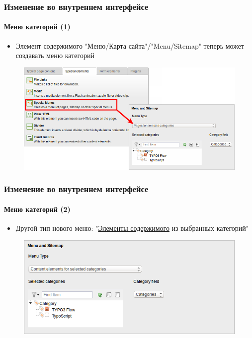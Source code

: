 
\begin{frame}[fragile]
	\frametitle{Изменение во внутреннем интерфейсе}
	\framesubtitle{Меню категорий (1)}

	\begin{itemize}
		\item Элемент содержимого "Меню/Карта сайта"/"Menu/Sitemap" теперь может создавать меню категорий
	\end{itemize}

	\begin{figure}
		\includegraphics[width=0.8\linewidth]{Images/BackendChanges/CategoryBasedMenus.png}
	\end{figure}

\end{frame}



\begin{frame}[fragile]
	\frametitle{Изменение во внутреннем интерфейсе}
	\framesubtitle{Меню категорий (2)}

	\begin{itemize}
		\item Другой тип нового меню: "\underline{Элементы содержимого} из выбранных категорий"
	\end{itemize}

	\begin{figure}
		\includegraphics[width=0.6\linewidth]{Images/BackendChanges/ContentElementsForSelectedCategories.png}
	\end{figure}

\end{frame}

